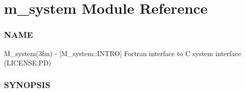 \hypertarget{namespacem__system}{}\section{m\+\_\+system Module Reference}
\label{namespacem__system}


\subsubsection*{N\+A\+ME}

M\+\_\+system(3fm) -\/ \mbox{[}M\+\_\+system\+::\+I\+N\+T\+RO\mbox{]} Fortran interface to C system interface (L\+I\+C\+E\+N\+SE\+:PD) \subsubsection*{S\+Y\+N\+O\+P\+S\+IS} 


